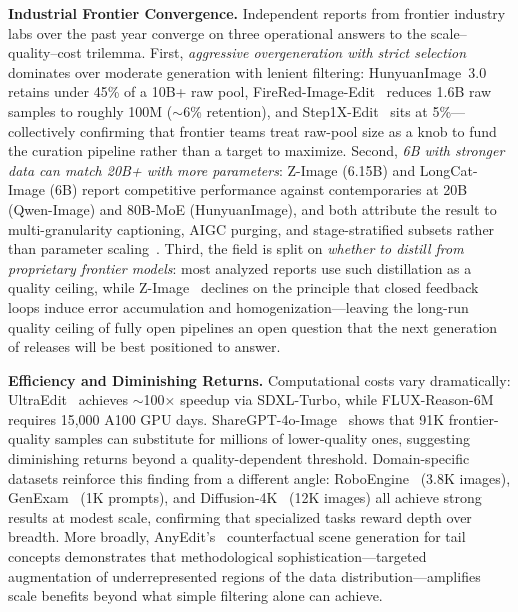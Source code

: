 \textbf{Industrial Frontier Convergence.}
Independent reports from frontier industry labs over the past year converge on three operational answers to the scale--quality--cost trilemma. First, \emph{aggressive overgeneration with strict selection} dominates over moderate generation with lenient filtering: HunyuanImage~3.0~\citep{cao2025hunyuanimage} retains under 45\% of a 10B+ raw pool, FireRed-Image-Edit~\citep{team2026firered} reduces 1.6B raw samples to roughly 100M ($\sim$6\% retention), and Step1X-Edit~\citep{liu2025step1x} sits at 5\%---collectively confirming that frontier teams treat raw-pool size as a knob to fund the curation pipeline rather than a target to maximize. Second, \emph{6B with stronger data can match 20B+ with more parameters}: Z-Image (6.15B) and LongCat-Image (6B) report competitive performance against contemporaries at 20B (Qwen-Image) and 80B-MoE (HunyuanImage), and both attribute the result to multi-granularity captioning, AIGC purging, and stage-stratified subsets rather than parameter scaling~\citep{cai2025z,team2025longcat}. Third, the field is split on \emph{whether to distill from proprietary frontier models}: most analyzed reports use such distillation as a quality ceiling, while Z-Image~\citep{cai2025z} declines on the principle that closed feedback loops induce error accumulation and homogenization---leaving the long-run quality ceiling of fully open pipelines an open question that the next generation of releases will be best positioned to answer.

\textbf{Efficiency and Diminishing Returns.}
Computational costs vary dramatically: UltraEdit~\citep{zhao2024ultraedit} achieves $\sim$100$\times$ speedup via SDXL-Turbo, while FLUX-Reason-6M~\citep{fang2025flux} requires 15,000 A100 GPU days. ShareGPT-4o-Image~\citep{chen2025sharegpt} shows that 91K frontier-quality samples can substitute for millions of lower-quality ones, suggesting diminishing returns beyond a quality-dependent threshold. Domain-specific datasets reinforce this finding from a different angle: RoboEngine~\citep{yuan2025roboengine} (3.8K images), GenExam~\citep{wang2025genexam} (1K prompts), and Diffusion-4K~\citep{zhang2025diffusion} (12K images) all achieve strong results at modest scale, confirming that specialized tasks reward depth over breadth. More broadly, AnyEdit's~\citep{yu2025anyedit} counterfactual scene generation for tail concepts demonstrates that methodological sophistication---targeted augmentation of underrepresented regions of the data distribution---amplifies scale benefits beyond what simple filtering alone can achieve.








